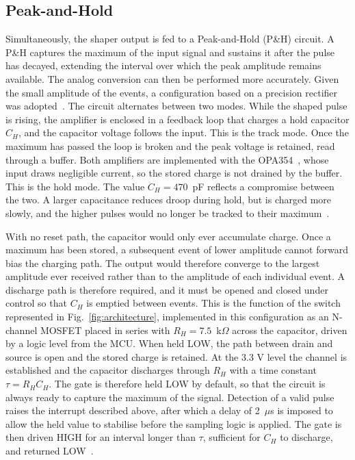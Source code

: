 \subsection{Peak-and-Hold}
Simultaneously, the shaper output is fed to a Peak-and-Hold (P\&H) circuit. A P\&H captures the maximum of the input signal and sustains it after the pulse has decayed, extending the interval over which the peak amplitude remains available. The analog conversion can then be performed more accurately. Given the small amplitude of the events, a configuration based on a precision rectifier was adopted~\cite{Franco2015}. The circuit alternates between two modes. While the shaped pulse is rising, the amplifier is enclosed in a feedback loop that charges a hold capacitor $C_H$, and the capacitor voltage follows the input. This is the track mode. Once the maximum has passed the loop is broken and the peak voltage is retained, read through a buffer. Both amplifiers are implemented with the OPA354~\cite{OPA354}, whose input draws negligible current, so the stored charge is not drained by the buffer. This is the hold mode. The value $C_H = 470$~pF reflects a compromise between the two. A larger capacitance reduces droop during hold, but is charged more slowly, and the higher pulses would no longer be tracked to their maximum~\cite{Franco2015,Horowitz2015}.

With no reset path, the capacitor would only ever accumulate charge. Once a maximum has been stored, a subsequent event of lower amplitude cannot forward bias the charging path. The output would therefore converge to the largest amplitude ever received rather than to the amplitude of each individual event. A discharge path is therefore required, and it must be opened and closed under control so that $C_H$ is emptied between events. This is the function of the switch represented in Fig.~\ref{fig:architecture}, implemented in this configuration as an N-channel MOSFET placed in series with $R_{H}=7.5$~k$\Omega$ across the capacitor, driven by a logic level from the MCU. When held LOW, the path between drain and source is open and the stored charge is retained. At the 3.3 V level the channel is established and the capacitor discharges through $R_H$ with a time constant $\tau = R_H C_H$. The gate is therefore held LOW by default, so that the circuit is always ready to capture the maximum of the signal. Detection of a valid pulse raises the interrupt described above, after which a delay of 2~$\mu$s is imposed to allow the held value to stabilise before the sampling logic is applied. The gate is then driven HIGH for an interval longer than $\tau$, sufficient for $C_H$ to discharge, and returned LOW~\cite{Franco2015}.


